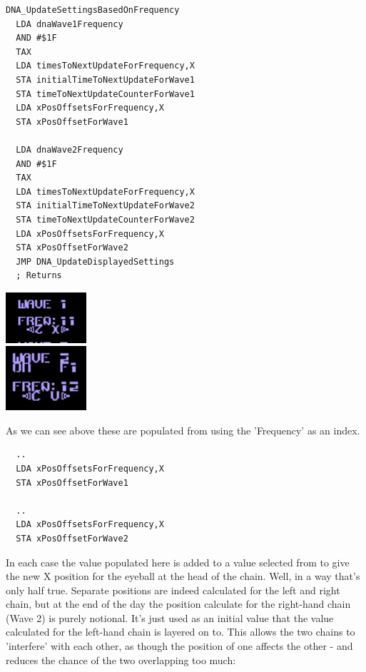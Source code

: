 \begin{minipage}[b]{0.75\linewidth}
\centering
\begin{lstlisting}[caption=The value selected for 'Frequency' for Wave 1 and 2 translates to settings used in calculating the next X position for each chain.]
DNA_UpdateSettingsBasedOnFrequency
  LDA dnaWave1Frequency
  AND #$1F
  TAX
  LDA timesToNextUpdateForFrequency,X
  STA initialTimeToNextUpdateForWave1
  STA timeToNextUpdateCounterForWave1
  LDA xPosOffsetsForFrequency,X
  STA xPosOffsetForWave1

  LDA dnaWave2Frequency
  AND #$1F
  TAX
  LDA timesToNextUpdateForFrequency,X
  STA initialTimeToNextUpdateForWave2
  STA timeToNextUpdateCounterForWave2
  LDA xPosOffsetsForFrequency,X
  STA xPosOffsetForWave2
  JMP DNA_UpdateDisplayedSettings
  ; Returns
\end{lstlisting}
\end{minipage}
\hspace{0.5cm}
\begin{minipage}[b]{0.25\linewidth}
\centering
      \includegraphics[width=3cm]{dna/dnafreq1.png}\\
      \vspace{1cm}
      \includegraphics[width=3cm]{dna/dnafreq2.png}%
      \vspace{1cm}
\end{minipage}
As we can see above these are populated from  using the 'Frequency' as an index.

\begin{lstlisting}
  ..
  LDA xPosOffsetsForFrequency,X
  STA xPosOffsetForWave1

  ..
  LDA xPosOffsetsForFrequency,X
  STA xPosOffsetForWave2
\end{lstlisting}

In each case the value populated here is added to a value selected from  to give the 
new X position for the eyeball at the head of the chain. Well, in a way that's only half true. Separate positions
are indeed calculated for the left and right chain, but at the end of the day the position calculate for the right-hand
chain (Wave 2) is purely notional. It's just used as an initial value that the value calculated for the left-hand chain
is layered on to. This allows the two chains to 'interfere' with each other, as though the position of one affects the
other - and reduces the chance of the two overlapping too much:

